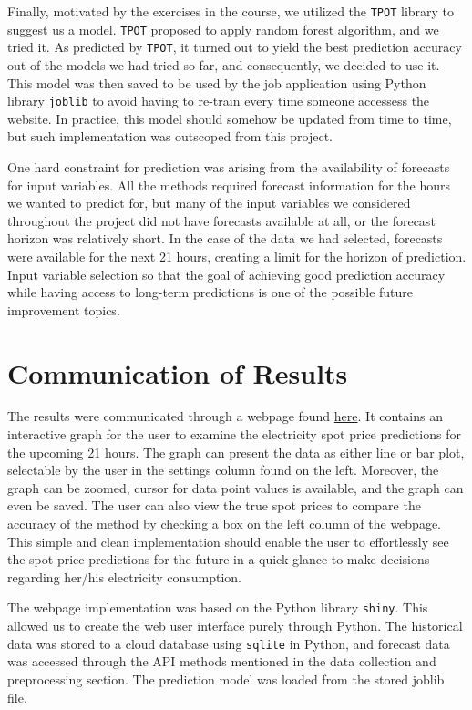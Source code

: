\documentclass{article}
\numberwithin{equation}{section}
\begin{document}
Finally, motivated by the exercises in the course, we utilized the \verb|TPOT| library to suggest us a model. \verb|TPOT| proposed to apply random forest algorithm, and we tried it. As predicted by \verb|TPOT|, it turned out to yield the best prediction accuracy out of the models we had tried so far, and consequently, we decided to use it. This model was then saved to be used by the job application using Python library \verb|joblib| to avoid having to re-train every time someone accessess the website. In practice, this model should somehow be updated from time to time, but such implementation was outscoped from this project.

One hard constraint for prediction was arising from the availability of forecasts for input variables. All the methods required forecast information for the hours we wanted to predict for, but many of the input variables we considered throughout the project did not have forecasts available at all, or the forecast horizon was relatively short. In the case of the data we had selected, forecasts were available for the next 21 hours, creating a limit for the horizon of prediction. Input variable selection so that the goal of achieving good prediction accuracy while having access to long-term predictions is one of the possible future improvement topics.

\section{Communication of Results}
The results were communicated through a webpage found \href{https://connect.posit.cloud/AhsanAbbas101/content/0192c52c-7101-3655-bc34-0e4733cd46de}{here}. It contains an interactive graph for the user to examine the electricity spot price predictions for the upcoming 21 hours. The graph can present the data as either line or bar plot, selectable by the user in the settings column found on the left. Moreover, the graph can be zoomed, cursor for data point values is available, and the graph can even be saved. The user can also view the true spot prices to compare the accuracy of the method by checking a box on the left column of the webpage. This simple and clean implementation should enable the user to effortlessly see the spot price predictions for the future in a quick glance to make decisions regarding her/his electricity consumption.

The webpage implementation was based on the Python library \verb|shiny|. This allowed us to create the web user interface purely through Python. The historical data was stored to a cloud database using \verb|sqlite| in Python, and forecast data was accessed through the API methods mentioned in the data collection and preprocessing section. The prediction model was loaded from the stored joblib file.
\end{document}
